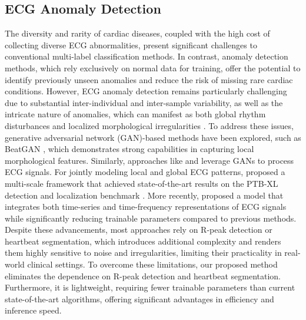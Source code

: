 \subsection{ECG Anomaly Detection}
The diversity and rarity of cardiac diseases, coupled with the high cost of collecting diverse ECG abnormalities, present significant challenges to conventional multi-label classification methods. In contrast, anomaly detection methods, which rely exclusively on normal data for training, offer the potential to identify previously unseen anomalies and reduce the risk of missing rare cardiac conditions. However, ECG anomaly detection remains particularly challenging due to substantial inter-individual and inter-sample variability, as well as the intricate nature of anomalies, which can manifest as both global rhythm disturbances and localized morphological irregularities \citep{liu2022time, jiang2023multi}. To address these issues, generative adversarial network (GAN)-based methods have been explored, such as BeatGAN \citep{liu2022time}, which demonstrates strong capabilities in capturing local morphological features. Similarly, approaches like \cite{qin2023novel} and \cite{wang2023ecggan} leverage GANs to process ECG signals. For jointly modeling local and global ECG patterns,  \cite{jiang2023multi} proposed a multi-scale framework that achieved state-of-the-art results on the PTB-XL detection and localization benchmark \citep{wagner2020ptb, jiang2023multi}. More recently, \cite{bui2024tsrnet} proposed a model that integrates both time-series and time-frequency representations of ECG signals while significantly reducing trainable parameters compared to previous methods. Despite these advancements, most approaches rely on R-peak detection or heartbeat segmentation, which introduces additional complexity and renders them highly sensitive to noise and irregularities, limiting their practicality in real-world clinical settings. To overcome these limitations, our proposed method eliminates the dependence on R-peak detection and heartbeat segmentation. Furthermore, it is lightweight, requiring fewer trainable parameters than current state-of-the-art algorithms, offering significant advantages in efficiency and inference speed.

